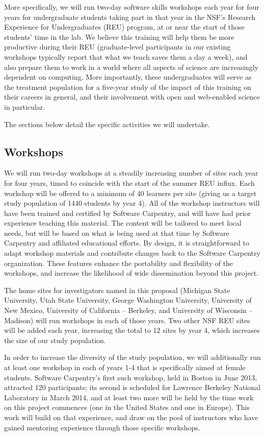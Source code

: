 \documentclass[11pt]{article}
\begin{document}
More specifically, we will run two-day software skills workshops each
year for four years for undergraduate students taking part in that
year in the NSF's Research Experience for Undergraduates (REU)
program, at or near the start of those students' time in the lab.  We
believe this training will help them be more productive during their
REU (graduate-level participants in our existing workshops typically
report that what we teach saves them a day a week), and also prepare
them to work in a world where all aspects of science are increasingly
dependent on computing.  More importantly, these undergraduates will
serve as the treatment population for a five-year study of the impact
of this training on their careers in general, and their involvement
with open and web-enabled science in particular.

The sections below detail the specific activities we will undertake.

\subsection{Workshops}

We will run two-day workshops at a steadily increasing number of sites
each year for four years, timed to coincide with the start of the
summer REU influx.  Each workshop will be offered to a minimum of 40
learners per site (giving us a target study population of 1440
students by year 4).  All of the
workshop instructors will have been trained and certified by Software
Carpentry, and will have had prior experience teaching this material.
The content will be tailored to meet local
needs, but will be based on what is being used at that time by
Software Carpentry and affiliated educational efforts.  By design, it is straightforward to adapt workshop materials and contribute changes back to the Software Carpentry organization.  These features enhance the portability and flexibility of the workshops, and increase the likelihood of wide dissemination beyond this project.  

The home sites for investigators named in this proposal (Michigan
State University, Utah State University, George Washington University,
University of New Mexico, University of California -- Berkeley, and
University of Wisconsin -- Madison) will run workshops in each of
those years.  Two other NSF REU sites will be added each year,
increasing the total to 12 sites by year 4, which increases the size of our study population.

In order to increase the diversity of the study population, we will
additionally run at least one workshop in each of years 1-4 that is
specifically aimed at female students.  Software Carpentry's first
such workshop, held in Boston in June 2013, attracted 120
participants; its second is scheduled for Lawrence Berkeley National
Laboratory in March 2014, and at least two more will be held by the
time work on this project commences (one in the United States and one
in Europe).  This work will build on that experience, and draw on the
pool of instructors who have gained mentoring experience through those
specific workshops.
\end{document}

